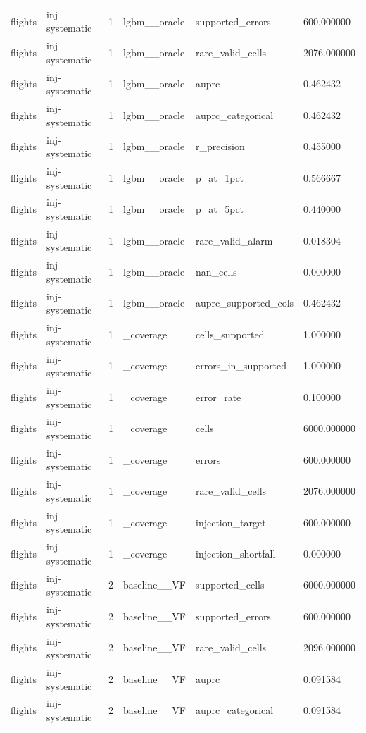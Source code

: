 \begin{tabular}{llllll}
flights & inj-systematic & 1 & lgbm\_\_oracle & supported\_errors & 600.000000 \\
flights & inj-systematic & 1 & lgbm\_\_oracle & rare\_valid\_cells & 2076.000000 \\
flights & inj-systematic & 1 & lgbm\_\_oracle & auprc & 0.462432 \\
flights & inj-systematic & 1 & lgbm\_\_oracle & auprc\_categorical & 0.462432 \\
flights & inj-systematic & 1 & lgbm\_\_oracle & r\_precision & 0.455000 \\
flights & inj-systematic & 1 & lgbm\_\_oracle & p\_at\_1pct & 0.566667 \\
flights & inj-systematic & 1 & lgbm\_\_oracle & p\_at\_5pct & 0.440000 \\
flights & inj-systematic & 1 & lgbm\_\_oracle & rare\_valid\_alarm & 0.018304 \\
flights & inj-systematic & 1 & lgbm\_\_oracle & nan\_cells & 0.000000 \\
flights & inj-systematic & 1 & lgbm\_\_oracle & auprc\_supported\_cols & 0.462432 \\
flights & inj-systematic & 1 & \_coverage & cells\_supported & 1.000000 \\
flights & inj-systematic & 1 & \_coverage & errors\_in\_supported & 1.000000 \\
flights & inj-systematic & 1 & \_coverage & error\_rate & 0.100000 \\
flights & inj-systematic & 1 & \_coverage & cells & 6000.000000 \\
flights & inj-systematic & 1 & \_coverage & errors & 600.000000 \\
flights & inj-systematic & 1 & \_coverage & rare\_valid\_cells & 2076.000000 \\
flights & inj-systematic & 1 & \_coverage & injection\_target & 600.000000 \\
flights & inj-systematic & 1 & \_coverage & injection\_shortfall & 0.000000 \\
flights & inj-systematic & 2 & baseline\_\_VF & supported\_cells & 6000.000000 \\
flights & inj-systematic & 2 & baseline\_\_VF & supported\_errors & 600.000000 \\
flights & inj-systematic & 2 & baseline\_\_VF & rare\_valid\_cells & 2096.000000 \\
flights & inj-systematic & 2 & baseline\_\_VF & auprc & 0.091584 \\
flights & inj-systematic & 2 & baseline\_\_VF & auprc\_categorical & 0.091584 \\

\end{tabular}
